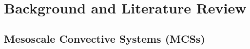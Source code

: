 \chapter{Background and Literature Review}
\label{ch:background}





\section{Mesoscale Convective Systems (MCSs)}

